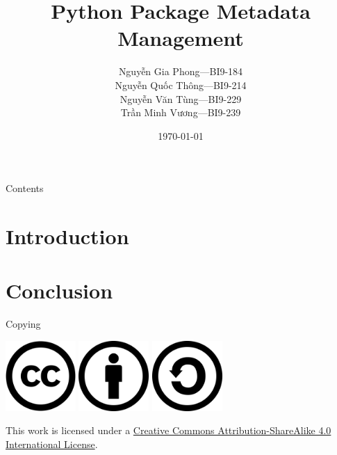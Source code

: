 \documentclass[pdf]{beamer}
\title{Python Package Metadata Management}
\author[Group 8]{Nguyễn Gia Phong---BI9-184\\
                 Nguyễn Quốc Thông---BI9-214\\
                 Nguyễn Văn Tùng---BI9-229\\
                 Trần Minh Vương---BI9-239}
\institute{University of Science and Technology of Hà Nội}
\date{\selectlanguage{english}\today}
\begin{document}
\frame{\titlepage}
\begin{frame}{Contents}
  \tableofcontents
\end{frame}

\section{Introduction}
\frame{\tableofcontents[currentsection]}

\section{Conclusion}
\frame{\tableofcontents[currentsection]}
\begin{frame}{Copying}\Large
  \begin{center}
    \includegraphics[width=0.2\textwidth]{CC.png}
    \includegraphics[width=0.2\textwidth]{BY.png}
    \includegraphics[width=0.2\textwidth]{SA.png}
  \end{center}

  This work is licensed under a
  \href{https://creativecommons.org/licenses/by-sa/4.0/}{Creative Commons
  Attribution-ShareAlike 4.0 International License}.
\end{frame}
\end{document}

